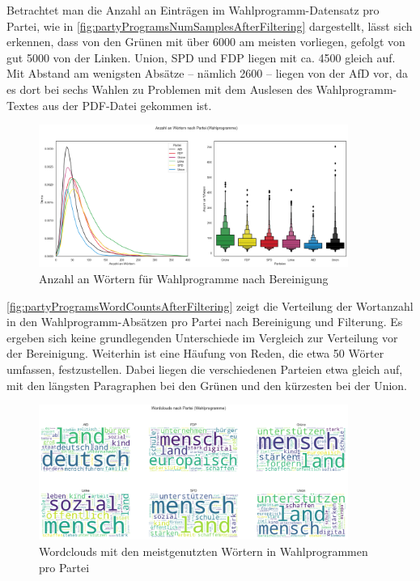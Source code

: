 Betrachtet man die Anzahl an Einträgen im Wahlprogramm-Datensatz pro Partei, wie in \autoref{fig:partyProgramsNumSamplesAfterFiltering} dargestellt, lässt sich erkennen, dass von den Grünen mit über \num{6000} am meisten vorliegen, gefolgt von gut \num{5000} von der Linken. Union, \ac{SPD} und \ac{FDP} liegen mit ca. \num{4500} gleich auf. Mit Abstand am wenigsten Absätze -- nämlich \num{2600} -- liegen von der \ac{AfD} vor, da es dort bei sechs Wahlen zu Problemen mit dem Auslesen des Wahlprogramm-Textes aus der \ac{PDF}-Datei gekommen ist.

\begin{figure}[H]
    \centering
    \includegraphics[width=0.9\textwidth]{data/images/party_programs_word_count_after_filter.png}
    \caption{Anzahl an Wörtern für Wahlprogramme nach Bereinigung} \label{fig:partyProgramsWordCountsAfterFiltering}
\end{figure}

\autoref{fig:partyProgramsWordCountsAfterFiltering} zeigt die Verteilung der Wortanzahl in den Wahlprogramm-Absätzen pro Partei nach Bereinigung und Filterung. Es ergeben sich keine grundlegenden Unterschiede im Vergleich zur Verteilung vor der Bereinigung. Weiterhin ist eine Häufung von Reden, die etwa \num{50} Wörter umfassen, festzustellen. Dabei liegen die verschiedenen Parteien etwa gleich auf, mit den längsten Paragraphen bei den Grünen und den kürzesten bei der Union.

\begin{figure}[H]
    \centering
    \includegraphics[width=0.9\textwidth]{data/images/party_programs_wordclouds.png}
    \caption{Wordclouds mit den meistgenutzten Wörtern in Wahlprogrammen pro Partei} \label{fig:partyProgramsWordclouds}
\end{figure}

